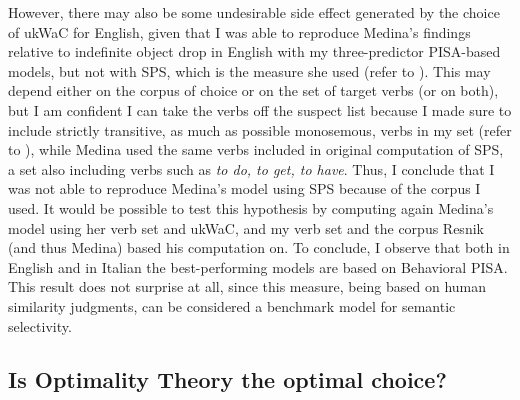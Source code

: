 However, there may also be some undesirable side effect generated by the choice of ukWaC for English, given that I was able to reproduce Medina's findings relative to indefinite object drop in English with my three-predictor PISA-based models, but not with SPS, which is the measure she used (refer to ). This may depend either on the corpus of choice or on the set of target verbs (or on both), but I am confident I can take the verbs off the suspect list because I made sure to include strictly transitive, as much as possible monosemous, verbs in my set (refer to ), while Medina used the same verbs included in  original computation of SPS, a set also including verbs such as \textit{to do, to get, to have}. Thus, I conclude that I was not able to reproduce Medina's model using SPS because of the corpus I used. It would be possible to test this hypothesis by computing again Medina's model using her verb set and ukWaC, and my verb set and the corpus Resnik (and thus Medina) based his computation on. %
To conclude, I observe that both in English and in Italian the best-performing models are based on Behavioral PISA. This result does not surprise at all, since this measure, being based on human similarity judgments, can be considered a benchmark model for semantic selectivity.


\subsection{Is Optimality Theory the optimal choice?}

